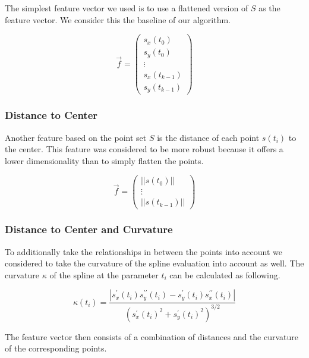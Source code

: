 \documentclass[pdftex,12pt,a4paper]{report}
\begin{document}
The simplest feature vector we used is to use a flattened version of $S$ as the feature
vector. We consider this the baseline of our algorithm.

\begin{equation}
\vec{f} = \left( \begin{array}{c}
s_x(t_0) \\
s_y(t_0) \\
\vdots \\
s_x(t_{k-1}) \\
s_y(t_{k-1})
\end{array} \right)
\end{equation}

\subsubsection{Distance to Center}

Another feature based on the point set $S$ is the distance of each point $s(t_i)$ to the
center. This feature was considered to be more robust because it offers a lower dimensionality
than to simply flatten the points.

\begin{equation}
\vec{f} = \left( \begin{array}{c}
||s(t_0)|| \\
\vdots \\
||s(t_{k-1})||
\end{array} \right)
\end{equation}

\subsubsection{Distance to Center and Curvature}
\label{subsub:featuredistancetocenterandcurvature}

To additionally take the relationships in between the points into account we considered
to take the curvature of the spline evaluation into account as well. The curvature $\kappa$ of the spline at the parameter $t_i$ can be calculated as following.

\begin{equation}
\kappa(t_i) = \frac{|s_x^\prime(t_i) s_y^{\prime\prime}(t_i) - s_y^\prime(t_i) s_x^{\prime\prime}(t_i)|}{(s_x^\prime(t_i)^2 + s_y^{\prime}(t_i)^2)^{3/2}}
\end{equation}

The feature vector then consists of a combination of distances and the curvature of the
corresponding points.
\end{document}
